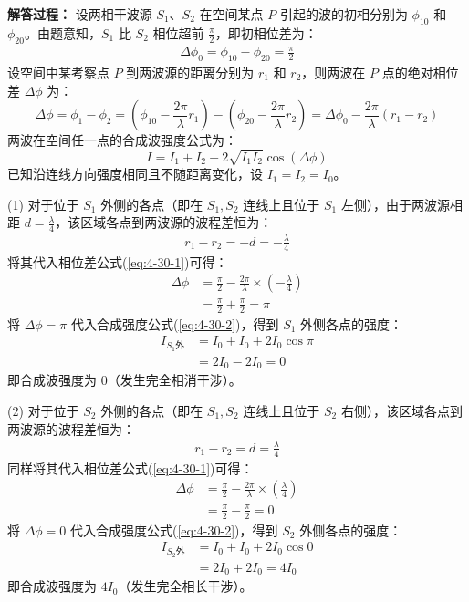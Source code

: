 \textbf{解答过程： }
设两相干波源 $S_1$、$S_2$ 在空间某点 $P$ 引起的波的初相分别为 $\phi_{10}$ 和 $\phi_{20}$。由题意知，$S_1$ 比 $S_2$ 相位超前 $\frac{\pi}{2}$，即初相位差为：
\begin{align*}
	\Delta \phi_0 = \phi_{10} - \phi_{20} = \frac{\pi}{2}
\end{align*}
设空间中某考察点 $P$ 到两波源的距离分别为 $r_1$ 和 $r_2$，则两波在 $P$ 点的绝对相位差 $\Delta \phi$ 为：
\begin{equation}\label{eq:4-30-1}
	\Delta \phi = \phi_1 - \phi_2 = (\phi_{10} - \frac{2\pi}{\lambda} r_1) - (\phi_{20} - \frac{2\pi}{\lambda} r_2) = \Delta \phi_0 - \frac{2\pi}{\lambda} (r_1 - r_2)
\end{equation}
两波在空间任一点的合成波强度公式为：
\begin{equation}\label{eq:4-30-2}
	I = I_1 + I_2 + 2\sqrt{I_1 I_2} \cos(\Delta \phi)
\end{equation}
已知沿连线方向强度相同且不随距离变化，设 $I_1 = I_2 = I_0$。

(1) 对于位于 $S_1$ 外侧的各点（即在 $S_1, S_2$ 连线上且位于 $S_1$ 左侧），由于两波源相距 $d = \frac{\lambda}{4}$，该区域各点到两波源的波程差恒为：
\begin{align*}
	r_1 - r_2 = -d = -\frac{\lambda}{4}
\end{align*}
将其代入相位差公式(\ref{eq:4-30-1})可得：
\begin{align*}
	\Delta \phi &= \frac{\pi}{2} - \frac{2\pi}{\lambda} \times (-\frac{\lambda}{4}) \\
	&= \frac{\pi}{2} + \frac{\pi}{2} = \pi
\end{align*}
将 $\Delta \phi = \pi$ 代入合成强度公式(\ref{eq:4-30-2})，得到 $S_1$ 外侧各点的强度：
\begin{align*}
	I_{S_1外} &= I_0 + I_0 + 2I_0 \cos\pi \\
	&= 2I_0 - 2I_0 = 0
\end{align*}
即合成波强度为 $0$（发生完全相消干涉）。

(2) 对于位于 $S_2$ 外侧的各点（即在 $S_1, S_2$ 连线上且位于 $S_2$ 右侧），该区域各点到两波源的波程差恒为：
\begin{align*}
	r_1 - r_2 = d = \frac{\lambda}{4}
\end{align*}
同样将其代入相位差公式(\ref{eq:4-30-1})可得：
\begin{align*}
	\Delta \phi &= \frac{\pi}{2} - \frac{2\pi}{\lambda} \times (\frac{\lambda}{4}) \\
	&= \frac{\pi}{2} - \frac{\pi}{2} = 0
\end{align*}
将 $\Delta \phi = 0$ 代入合成强度公式(\ref{eq:4-30-2})，得到 $S_2$ 外侧各点的强度：
\begin{align*}
	I_{S_2外} &= I_0 + I_0 + 2I_0 \cos 0 \\
	&= 2I_0 + 2I_0 = 4I_0
\end{align*}
即合成波强度为 $4I_0$（发生完全相长干涉）。

